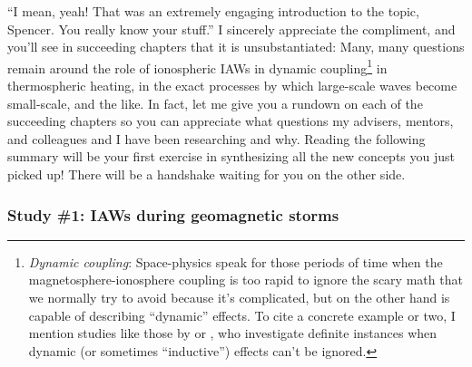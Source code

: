 ``I mean, yeah! That was an extremely engaging introduction to the topic,
Spencer. You really know your stuff.'' I sincerely appreciate the compliment,
and you'll see in succeeding chapters that it is unsubstantiated: Many, many
questions remain around the role of ionospheric IAWs in dynamic
coupling\footnote{\textit{Dynamic coupling}: Space-physics speak for those
  periods of time when the magnetosphere-ionosphere coupling is too rapid to
  ignore the scary math that we normally try to avoid because it's complicated,
  but on the other hand is capable of describing ``dynamic'' effects. To cite a
  concrete example or two, I mention studies like those by \citet{Mishin2015} or
  \citet{Verkhoglyadova2016}, who investigate definite instances when dynamic
  (or sometimes ``inductive'') effects can't be ignored.} in thermospheric
heating, in the exact processes by which large-scale waves become small-scale,
and the like. In fact, let me give you a rundown on each of the succeeding
chapters so you can appreciate what questions my advisers, mentors, and
colleagues and I have been researching and why. Reading the following summary
will be your first exercise in synthesizing all the new concepts you just picked
up! There will be a handshake waiting for you on the other side.




\subsubsection{Study \#1: IAWs during geomagnetic storms}

